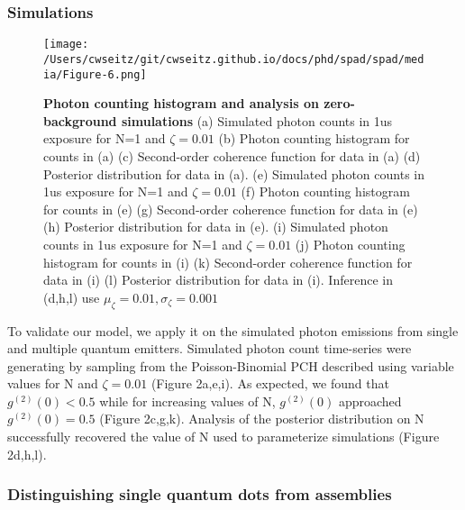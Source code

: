\subsubsection{Simulations}

\begin{figure}
\centering
\texttt{[image: /Users/cwseitz/git/cwseitz.github.io/docs/phd/spad/spad/media/Figure-6.png]}
\caption{\textbf{Photon counting histogram and analysis on zero-background simulations} (a) Simulated photon counts in 1us exposure for N=1 and $\zeta=0.01$ (b) Photon counting histogram for counts in (a) (c) Second-order coherence function for data in (a) (d) Posterior distribution for data in (a). (e) Simulated photon counts in 1us exposure for N=1 and $\zeta=0.01$ (f) Photon counting histogram for counts in (e) (g) Second-order coherence function for data in (e) (h) Posterior distribution for data in (e). (i) Simulated photon counts in 1us exposure for N=1 and $\zeta=0.01$ (j) Photon counting histogram for counts in (i) (k) Second-order coherence function for data in (i) (l) Posterior distribution for data in (i). Inference in (d,h,l) use $\mu_\zeta=0.01,\sigma_\zeta=0.001$}
\label{fig:pch}
\end{figure}  

To validate our model, we apply it on the simulated photon emissions from single and multiple quantum emitters. Simulated photon count time-series were generating by sampling from the Poisson-Binomial PCH described using variable values for N and $\zeta=0.01$ (Figure 2a,e,i). As expected, we found that $g^{(2)}(0)<0.5$  while for increasing values of N, $g^{(2)}(0)$ approached $g^{(2)}(0)=0.5$ (Figure 2c,g,k). Analysis of the posterior distribution on N successfully recovered the value of N used to parameterize simulations (Figure 2d,h,l). 

\subsubsection{Distinguishing single quantum dots from assemblies}

